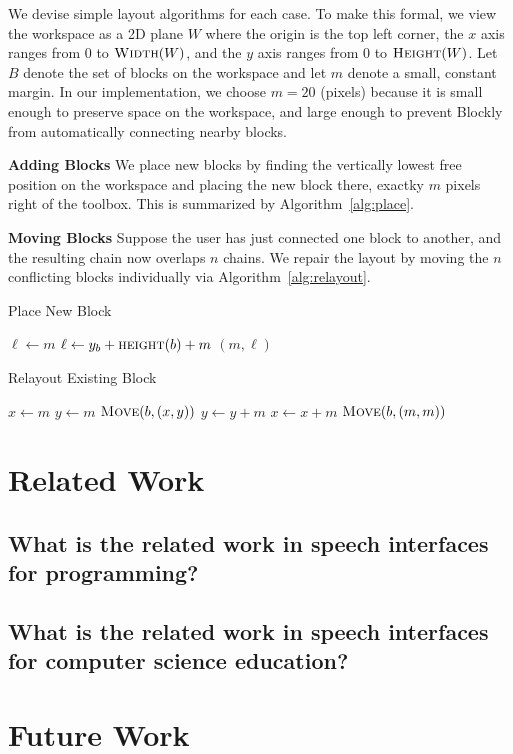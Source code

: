\documentclass[]{article}
\begin{document}
We devise simple layout algorithms for each case. To make this formal, we view
the workspace as a 2D plane $W$ where the origin is the top left corner, the $x$ axis ranges from 0
to $\textsc{Width}(W)$, and the $y$ axis ranges from 0 to $\textsc{Height}(W)$.
Let $B$ denote the set of blocks on the workspace and let $m$ denote a small, constant margin.
In our implementation, we choose $m = 20$ (pixels) because it is small enough to preserve space
on the workspace, and large enough to prevent Blockly from automatically connecting nearby blocks.

\textbf{Adding Blocks} We place new blocks by finding the vertically lowest free
position on the workspace and placing the new block there, exactky $m$ pixels right of
the toolbox. This is summarized by Algorithm~\ref{alg:place}.

\textbf{Moving Blocks} Suppose the user has just connected one block to another, and the
resulting chain now overlaps $n$ chains. We repair the layout by moving the $n$ conflicting
blocks individually via Algorithm~\ref{alg:relayout}. 

\begin{algorithm}[H]
\caption{Place New Block}\label{alg:place}
\begin{algorithmic}
\State $\ell \gets m$ 
		\State $\ell \gets y_b + \textsc{height}(b) + m$
	\EndIf
\EndFor
\State \Return $(m, \ell)$
\EndProcedure
\end{algorithmic}
\end{algorithm}

\begin{algorithm}[H]
\caption{Relayout Existing Block}\label{alg:relayout}
\begin{algorithmic}
\State $x \gets m$
	\State $y \gets m$
				\State $\textsc{Move}(b, (x,y))$
		\EndIf
		\State $y \gets y + m$
	\EndWhile
	\State $x \gets x + m$
\EndWhile
\State $\textsc{Move}(b, (m,m))$
\EndProcedure
\end{algorithmic}
\end{algorithm}

\section{Related Work}

\subsection{What is the related work in speech interfaces for programming?}

\subsection{What is the related work in speech interfaces for computer science education?}


\section{Future Work}



\end{document}
